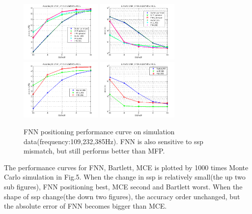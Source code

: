 \begin{figure}
\includegraphics[width=4cm,height=3cm]{figure/Accuracy_to_SNR_FNN_vs_Bartlett_MCE}
\includegraphics[width=4cm,height=3cm]{figure/Error_to_SNR_FNN_vs_Bartlett_MCE}
\includegraphics[width=4cm,height=3cm]{figure/Accuracy_to_SNR_FNN_vs_Bartlett_MCE_i906}
\includegraphics[width=4cm,height=3cm]{figure/Error_to_SNR_FNN_vs_Bartlett_MCE_i906}
\caption{FNN positioning performance curve on simulation data(frequency:109,232,385Hz).
 FNN is also sensitive to ssp mismatch, but still performs better than MFP.
}
\end{figure}

The performance curves for FNN, Bartlett, MCE is plotted by 1000 times Monte Carlo simulation in Fig.5. When the change in ssp is relatively small(the up two sub figures), FNN positioning best, MCE second and Bartlett worst.
When the shape of ssp change(the down two figures), the accuracy order unchanged, but the absolute error of FNN becomes bigger than MCE.

